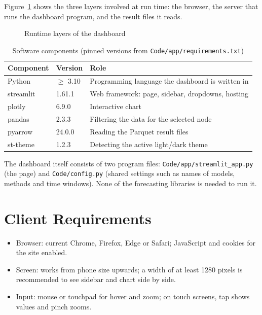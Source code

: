 Figure~\ref{fig:runtimeArchitecture} shows the three layers involved at run time: the browser, the server that runs the dashboard program, and the result files it reads.

\begin{figure}[H]
  \centering
  \resizebox{\linewidth}{!}{}
  \caption{Runtime layers of the dashboard}
  \label{fig:runtimeArchitecture}
\end{figure}

\begin{table}[H]
\centering
\caption{Software components (pinned versions from \texttt{Code/app/requirements.txt})}
\label{tab:specPackages}
\small
\begin{tabularx}{\linewidth}{@{}llX@{}}
\toprule
\textbf{Component} & \textbf{Version} & \textbf{Role} \\
\midrule
Python      & $\geq$ 3.10 & Programming language the dashboard is written in \\
streamlit   & 1.61.1 & Web framework: page, sidebar, dropdowns, hosting \cite{Streamlit:2026} \\
plotly      & 6.9.0  & Interactive chart \cite{Plotly:2026} \\
pandas      & 2.3.3  & Filtering the data for the selected node \\
pyarrow     & 24.0.0 & Reading the Parquet result files \\
st-theme    & 1.2.3  & Detecting the active light/dark theme \\
\bottomrule
\end{tabularx}
\end{table}

The dashboard itself consists of two program files: \texttt{Code/app/streamlit\_app.py} (the page) and \texttt{Code/config.py} (shared settings such as names of models, methods and time windows). None of the forecasting libraries is needed to run it.

\section{Client Requirements}
\label{sec:specClient}

\begin{itemize}
  \item Browser: current Chrome, Firefox, Edge or Safari; JavaScript and cookies for the site enabled.
  \item Screen: works from phone size upwards; a width of at least 1280 pixels is recommended to see sidebar and chart side by side.
  \item Input: mouse or touchpad for hover and zoom; on touch screens, tap shows values and pinch zooms.
\end{itemize}

